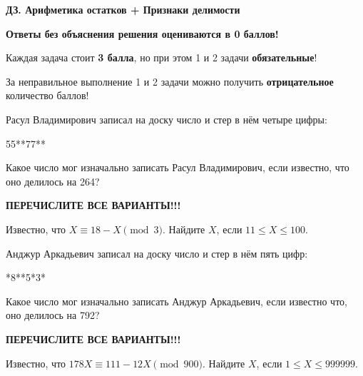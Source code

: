 \centerline{\bf \Huge ДЗ. Арифметика остатков + Признаки делимости}
\centerline{\bf \Huge }

\begin{flushright}
        \scriptsize{\textbf{Ответы без объяснения решения оцениваются в 0 баллов!}}
\end{flushright}

Каждая задача стоит \textbf{3 балла}, но при этом 1 и 2 задачи \textbf{обязательные}! 

За неправильное выполнение 1 и 2 задачи можно получить \textbf{отрицательное} количество баллов!

 Расул Владимирович записал на доску число и стер в нём четыре цифры: 

55**77**

Какое число мог изначально записать Расул Владимирович, если известно, что оно делилось на 264?

\textbf{ПЕРЕЧИСЛИТЕ ВСЕ ВАРИАНТЫ!!!}


 Известно, что $X\equiv18-X\pmod3$. Найдите $X$, если $11 \leqslant X  \leqslant 100$.

 Анджур Аркадьевич записал на доску число и стер в нём пять цифр:

*8**5*3*

Какое число мог изначально записать Анджур Аркадьевич, если известно что, оно делилось на 792? 

\textbf{ПЕРЕЧИСЛИТЕ ВСЕ ВАРИАНТЫ!!!}

  Известно, что $178X\equiv111-12X\pmod{900}$. Найдите $X$, если $1 \leqslant X  \leqslant 999999$.